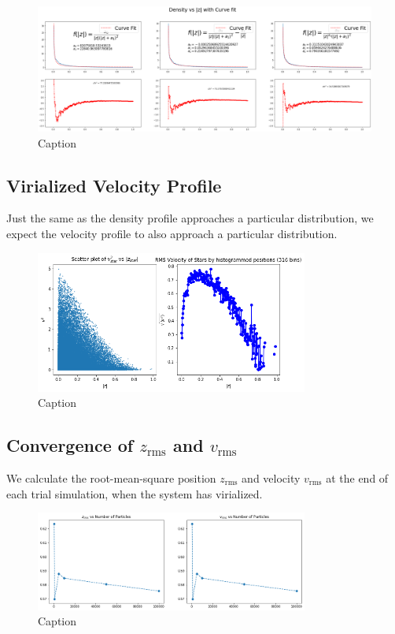 \documentclass[oneside]{book}
\begin{document}
\begin{figure}[h]
    \centering
    \includegraphics[width = \textwidth]{Images/DensityCurveFit.png}
    \caption{Caption}
    \label{Density Curve Fit}
\end{figure}

\subsection{Virialized Velocity Profile}
Just the same as the density profile approaches a particular distribution, we expect the velocity profile to also approach a particular distribution.
\begin{figure}[h]
    \centering
    \includegraphics[width = 0.8\textwidth]{Images/VelocityDistribution.png}
    \caption{Caption}
    \label{Velocity Profile}
\end{figure}


\subsection{Convergence of $z_\text{rms}$ and $v_\text{rms}$}
We calculate the root-mean-square position $z_\text{rms}$ and velocity $v_\text{rms}$ at the end of each trial simulation, when the system has virialized.
\begin{figure}[h]
    \centering
    \includegraphics[width=0.8\textwidth]{Images/RMS_Convergence.png}
    \caption{Caption}
    \label{fig:my_label}
\end{figure}
\end{document}

